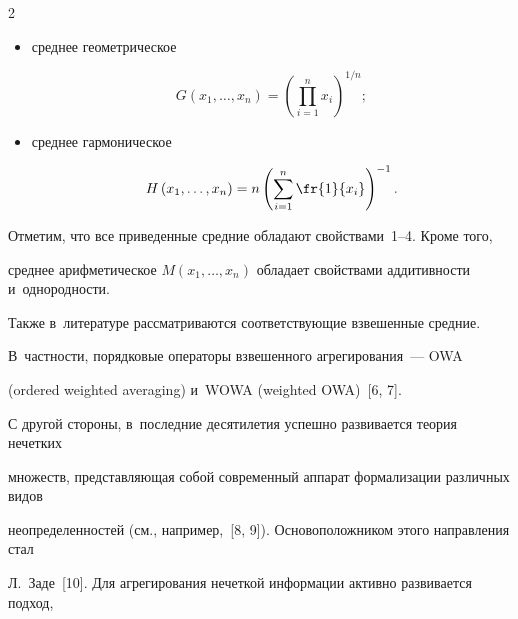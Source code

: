 \begin{multicols}{2}
\begin{itemize}
\noindent


$$


M\left(x_1,\ldots, x_n\right) = \fr{1}{n}\sum\limits_{i=1}^nx_i\,;


$$ 


\item


среднее геометрическое 





\noindent


$$


G\left(x_1,\ldots, x_n\right) = \left(\prod\limits_{i=1}^nx_i\right)^{1/n};


$$ 


\item среднее гармоническое 





\noindent


$$


H\left(x_1,\ldots, x_n\right) = n\left(\sum\limits_{i=1}^n \fr{1}{x_i}\right)^{-1}.


$$  


\end{itemize}


Отметим, что все приведенные средние обладают свойствами~1--4. Кроме того, 


среднее арифметическое $M(x_1,\ldots, x_n)$ обладает  свойствами ад\-ди\-тив\-ности и~од\-но\-род\-ности.








Также в~литературе рассматриваются соответствующие взвешенные средние. 


В~част\-ности,  порядковые операторы взвешенного агрегирования~--- OWA 


(ordered weighted averaging) и~WOWA (weighted OWA)~[6, 7].





С другой стороны, в~последние десятилетия успешно развивается теория нечетких 


множеств, представляющая собой современный аппарат формализации различных видов 


неопределенностей (см., например,~[8, 9]). Основоположником этого направления стал 


Л.~Заде~[10].  Для агрегирования нечеткой информации активно развивается подход, 



\end{multicols}
